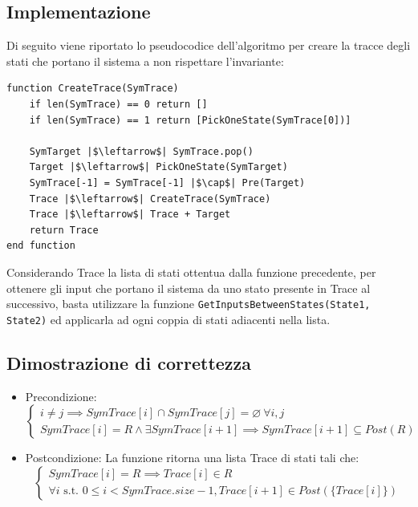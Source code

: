 \documentclass[12pt]{article}
\begin{document}
    \subsection{Implementazione}
    Di seguito viene riportato lo pseudocodice dell'algoritmo per creare la tracce degli stati che portano il sistema a non rispettare l'invariante:
    \begin{verbatim}
function CreateTrace(SymTrace)
    if len(SymTrace) == 0 return []
    if len(SymTrace) == 1 return [PickOneState(SymTrace[0])]

    SymTarget |$\leftarrow$| SymTrace.pop()
    Target |$\leftarrow$| PickOneState(SymTarget)
    SymTrace[-1] = SymTrace[-1] |$\cap$| Pre(Target)
    Trace |$\leftarrow$| CreateTrace(SymTrace)
    Trace |$\leftarrow$| Trace + Target
    return Trace
end function
    \end{verbatim}
    Considerando Trace la lista di stati ottentua dalla funzione precedente, per ottenere gli input che portano il sistema da uno stato presente in Trace al successivo, basta utilizzare la funzione \texttt{GetInputsBetweenStates(State1, State2)} ed applicarla ad ogni coppia di stati adiacenti nella lista.
    
    \subsection{Dimostrazione di correttezza}
    \begin{itemize}
        \item Precondizione:
        \begin{equation}
            \begin{cases}
                i \neq j \implies SymTrace[i] \cap SymTrace[j] = \varnothing\ \forall i, j \\
                SymTrace[i] = R \wedge \exists SymTrace[i+1] \implies SymTrace[i+1] \subseteq Post(R)
            \end{cases}
        \end{equation}
        \item Postcondizione: La funzione ritorna una lista Trace di stati tali che:
        \begin{equation}
            \begin{cases}
                SymTrace[i] = R \implies Trace[i] \in R \\
                \forall i \mbox{ s.t. } 0 \leq i < SymTrace.size - 1, Trace[i+1] \in Post(\{Trace[i]\})
            \end{cases}
        \end{equation}
    \end{itemize}
\end{document}
